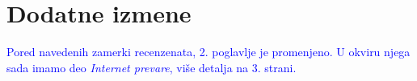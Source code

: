 \documentclass[a4paper]{report}
\newcommand{\odgovor}[1]{\textcolor{blue}{#1}}
\begin{document}
\chapter{Dodatne izmene}
\odgovor{Pored navedenih zamerki recenzenata, 2. poglavlje je promenjeno. U okviru njega sada imamo deo \textit{Internet prevare}, više detalja na 3. strani.}
\end{document}
